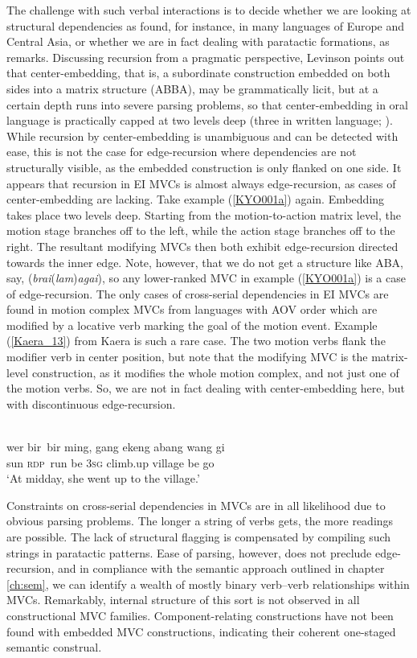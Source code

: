 The challenge with such verbal interactions is to decide whether we are looking at structural dependencies as found, for instance, in many languages of Europe and Central Asia, or whether we are in fact dealing with paratactic formations, as \citep[151]{levinson2013recursion} remarks. Discussing recursion from a pragmatic perspective, Levinson points out that center-embedding, that is, a subordinate construction embedded on both sides into a matrix structure (ABBA), may be grammatically licit, but at a certain depth runs into severe parsing problems, so that center-embedding in oral language is practically capped at two levels deep (three in written language; \citealt[154]{levinson2013recursion}). While recursion by center-embedding is unambiguous and can be detected with ease, this is not the case for edge-recursion where dependencies are not structurally visible, as the embedded construction is only flanked on one side. It appears that recursion in EI MVCs is almost always edge-recursion, as cases of center-embedding are lacking. Take example (\ref{KYO001a}) again. Embedding takes place two levels deep. Starting from the motion-to-action matrix level, the motion stage branches off to the left, while the action stage branches off to the right. The resultant modifying MVCs then both exhibit edge-recursion directed towards the inner edge. Note, however, that we do not get a structure like ABA, say, (\textit{brai}(\textit{lam})\textit{agai}), so any lower-ranked MVC in example (\ref{KYO001a}) is a case of edge-recursion. The only cases of cross-serial dependencies in EI MVCs are found in motion complex MVCs from languages with AOV order which are modified by a locative verb marking the goal of the motion event. Example (\ref{Kaera_13}) from Kaera is such a rare case. The two motion verbs flank the modifier verb in center position, but note that the modifying MVC is the matrix-level construction, as it modifies the whole motion complex, and not just one of the motion verbs. So, we are not in fact dealing with center-embedding here, but with discontinuous edge-recursion.

\ea \label{Kaera_13}
\\
\gll wer bir~bir ming, gang ekeng abang wang gi \\
sun \textsc{rdp}~run be 3\textsc{sg} climb.up village be go \\
\glft `At midday, she went up to the village.'\\ 
\z

Constraints on cross-serial dependencies in MVCs are in all likelihood due to obvious parsing problems. The longer a string of verbs gets, the more readings are possible. The lack of structural flagging is compensated by compiling such strings in paratactic patterns. Ease of parsing, however, does not preclude edge-recursion, and in compliance with the semantic approach outlined in chapter \ref{ch:sem}, we can identify a wealth of mostly binary verb--verb relationships within MVCs. Remarkably, internal structure of this sort is not observed in all constructional MVC families. Component-relating constructions have not been found with embedded MVC constructions, indicating their coherent one-staged semantic construal.

